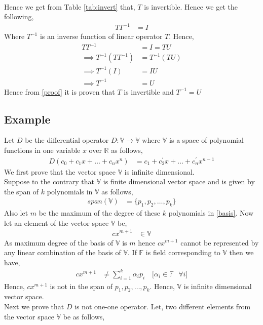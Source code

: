 \documentclass[journal,12pt,twocolumn]{IEEEtran}
\begin{document}
\\Hence we get from Table \ref{tab:invert} that, $T$ is invertible.
Hence we get the following,
\begin{align}
TT^{-1} &= I
\end{align}
Where $T^{-1}$ is an inverse function of linear operator $T$. Hence,
\begin{align}
TT^{-1} &= I = TU\\
\implies T^{-1}(TT^{-1}) &= T^{-1}(TU)\\
\implies T^{-1}(I) &= IU\\
\implies T^{-1} &= U\label{proof}
\end{align}
Hence from \eqref{proof} it is proven that $T$ is invertible and $T^{-1} = U$
\subsection{Example}
Let $D$ be the differential operator $D:\mathbb{V} \xrightarrow{} \mathbb{V}$ where $\mathbb{V}$ is a space of polynomial functions in one variable $x$ over $\mathbb{R}$ as follows,
\begin{align}
D(c_0+c_1x+\dots+c_nx^n) &= c_1+c^{\prime}_2x+\dots+c^{\prime}_nx^{n-1}\label{See}
\end{align}
We first prove that the vector space $\mathbb{V}$ is infinite dimensional.\\
Suppose to the contrary that $\mathbb{V}$ is finite dimensional vector space and is given by the span of $k$ polynomials in $\mathbb{V}$ as follows,
\begin{align}
span(\mathbb{V}) &= \{p_1,p_2,\dots,p_k\}\label{basis}
\end{align}
Also let $m$ be the maximum of the degree of these $k$ polynomials in \eqref{basis}. Now let an element of the vector space $\mathbb{V}$ be,
\begin{align}
cx^{m+1} &\in \mathbb{V}
\end{align}
As maximum degree of the basis of $\mathbb{V}$ is $m$ hence $cx^{m+1}$ cannot be represented by any linear combination of the basis of $\mathbb{V}$. If $\mathbb{F}$ is field corresponding to $\mathbb{V}$ then we have,
\begin{align}
cx^{m+1} &\ne \sum_{i=1}^{k}\alpha_ip_i \quad{\text{[$\alpha_i \in \mathbb{F}$ $\forall i$]}}
\end{align}
Hence, $cx^{m+1}$ is not in the span of ${p_1,p_2,\dots,p_k}$. Hence, $\mathbb{V}$ is infinite dimensional vector space.\\
Next we prove that $D$ is not one-one operator. Let, two different elements from the vector space $\mathbb{V}$ be as follows,
\end{document}

